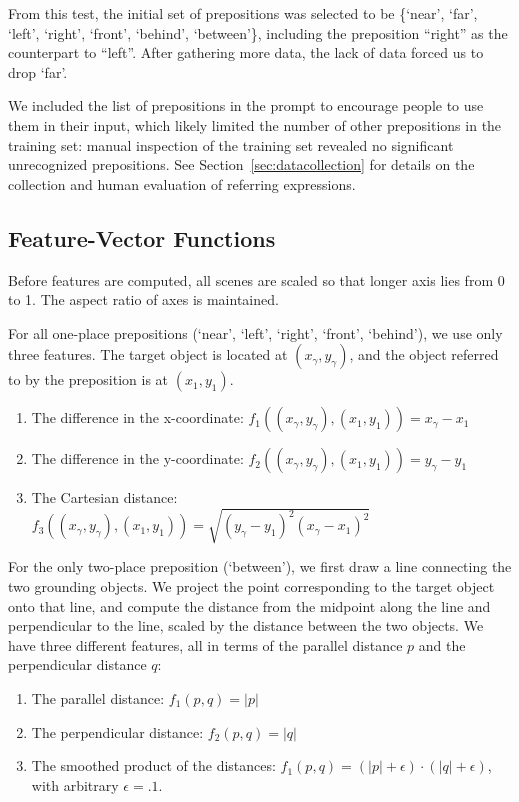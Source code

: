 \documentclass[conference]{IEEEtran}
\numberwithin{equation}{section}
\begin{document}
From this test, the initial set of prepositions was selected to be \{`near', `far', `left', `right', `front', `behind', `between'\}, including the preposition ``right'' as the counterpart to ``left''. After gathering more data, the lack of data forced us to drop `far'. 

We included the list of prepositions in the prompt to encourage people to use them in their input, which likely limited the number of other prepositions in the training set: manual inspection of the training set revealed no significant unrecognized prepositions. See Section~\ref{sec:datacollection} for details on the collection and human evaluation of referring expressions.

\subsection{Feature-Vector Functions}
\label{sec:featurevectors}

Before features are computed, all scenes are scaled so that longer axis lies from 0 to 1. The aspect ratio of axes is maintained.

For all one-place prepositions (`near', `left', `right', `front', `behind'), we use only three features. The target object is located at $(x_\gamma, y_\gamma)$, and the object referred to by the preposition is at $(x_1, y_1)$. 
\begin{flushleft}
\begin{enumerate}
\item The difference in the x-coordinate: $f_1((x_\gamma, y_\gamma), (x_1, y_1)) = x_\gamma - x_1$
\item The difference in the y-coordinate: $f_2((x_\gamma, y_\gamma), (x_1, y_1)) = y_\gamma - y_1$
\item The Cartesian distance: $f_3((x_\gamma, y_\gamma), (x_1, y_1)) = \sqrt{(y_\gamma - y_1)^2 (x_\gamma - x_1)^2}$
\end{enumerate}
\end{flushleft}

For the only two-place preposition (`between'), we first   draw a line connecting the two grounding objects. We project the point corresponding to the target object onto that line, and compute the distance from the midpoint along the line and perpendicular to the line, scaled by the distance between the two objects. 
We have three different features, all in terms of the parallel distance $p$ and the perpendicular distance $q$: 
\begin{flushleft}
\begin{enumerate}
\item The parallel distance: $f_1(p, q) = |p|$
\item The perpendicular distance: $f_2(p, q) = |q|$
\item The smoothed product of the distances: $f_1(p, q) = (|p| +\epsilon)\cdot(|q| + \epsilon)$, with arbitrary $\epsilon = .1$.
\end{enumerate}
\end{flushleft}
\end{document}
